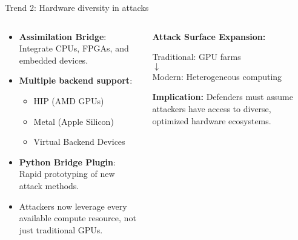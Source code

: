 \documentclass[aspectratio=169, lualatex, handout]{beamer}
\begin{document}
\begin{frame}{Trend 2: Hardware diversity in attacks}
	\begin{columns}[c]
		\begin{column}{0.55\textwidth}
			\begin{itemize}
				\item \textbf{Assimilation Bridge}: Integrate CPUs, FPGAs, and embedded devices.
				\item \textbf{Multiple backend support}:
				      \begin{itemize}
					      \item HIP (AMD GPUs)
					      \item Metal (Apple Silicon)
					      \item Virtual Backend Devices
				      \end{itemize}
				\item \textbf{Python Bridge Plugin}: Rapid prototyping of new attack methods.
				\item Attackers now leverage every available compute resource, not just traditional GPUs.
			\end{itemize}
		\end{column}
		\begin{column}{0.45\textwidth}
			\begin{tcolorbox}[colback=black!5!white,colframe=ciphergray]
				\textbf{Attack Surface Expansion:}
				\vspace{0.2cm}
				\begin{center}
					Traditional: GPU farms\\
					$\downarrow$\\
					Modern: Heterogeneous computing
				\end{center}
				\vspace{0.3cm}
				\textcolor{cipherprimary}{\textbf{Implication:} \small Defenders must assume attackers have access to diverse, optimized hardware ecosystems.}
			\end{tcolorbox}
		\end{column}
	\end{columns}
\end{frame}
\end{document}

